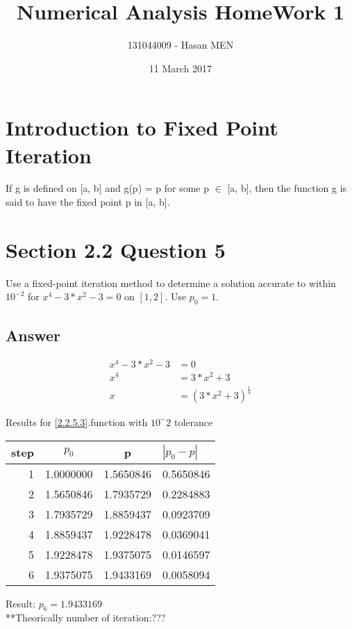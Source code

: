\documentclass{article}
\title{Numerical Analysis HomeWork 1}
\author{131044009 - Hasan MEN}
\date{11 March 2017}
\begin{document}
\maketitle



\section{Introduction to Fixed Point Iteration}
If g is defined on [a, b] and g(p) = p for some p $\in$ [a, b], then the function g is said to have the fixed point p in [a, b].


\section{Section 2.2 Question 5}
Use a fixed-point iteration method to determine a solution accurate to within $10^{-2}$ for $x^4-3*x^2-3 = 0$ on $[1, 2]$. Use $p_0 = 1$.
\subsection{Answer}
\begin{align}
\label{2.2.5.1}
x^4-3*x^2-3 & = 0\\
\label{2.2.5.2}
x^4 & = 3*x^2+3\\
\label{2.2.5.3}
x & = (3*x^2+3)^ \frac{1}{4}
\end{align}

Results for \ref{2.2.5.3}.function with $10^-2$ tolerance\\
\begin{tabular}{r|cc|l}
step & $p_0$ & p & $|p_0-p|$\\
\hline
1 & 1.0000000 & 1.5650846 & 0.5650846\\
2 & 1.5650846 & 1.7935729 & 0.2284883\\
3 & 1.7935729 & 1.8859437 & 0.0923709\\
4 & 1.8859437 & 1.9228478 & 0.0369041\\
5 & 1.9228478 & 1.9375075 & 0.0146597\\
6 & 1.9375075 & 1.9433169 & 0.0058094\\
\end{tabular}
Result: $p_6= 1.9433169$\\
**Theorically number of iteration:???
\end{document}
